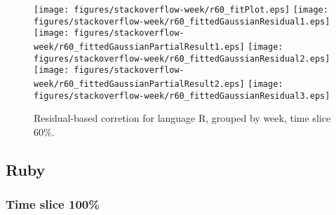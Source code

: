 \begin{figure}[t]
\centering
{}
{\texttt{[image: figures/stackoverflow-week/r60\_fitPlot.eps]}}
{\texttt{[image: figures/stackoverflow-week/r60\_fittedGaussianResidual1.eps]}}
{\texttt{[image: figures/stackoverflow-week/r60\_fittedGaussianPartialResult1.eps]}}
{\texttt{[image: figures/stackoverflow-week/r60\_fittedGaussianResidual2.eps]}}
{\texttt{[image: figures/stackoverflow-week/r60\_fittedGaussianPartialResult2.eps]}}
{\texttt{[image: figures/stackoverflow-week/r60\_fittedGaussianResidual3.eps]}}
\caption{Residual-based corretion for language R, grouped by week, time slice 60\%.}
\end{figure}


\FloatBarrier


\subsection{Ruby}

\subsubsection{Time slice 100\%}

